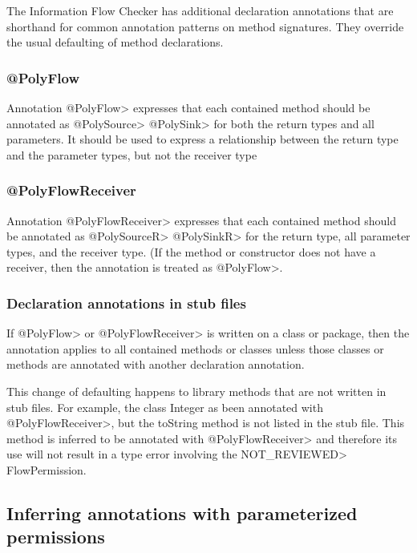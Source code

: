 The Information Flow Checker has additional declaration annotations that are shorthand for common 
annotation patterns on method signatures.   They override the usual defaulting of method declarations.

\subsubsection{@PolyFlow\label{sec:polyflow}}

Annotation \<@PolyFlow> expresses that each contained method should be annotated as \<@PolySource> 
\<@PolySink> for both the return types and all parameters. It should be used to express a relationship 
between the return type and the parameter types, but not the receiver type

\subsubsection{@PolyFlowReceiver\label{sec:polyflowreceiver}}

Annotation \<@PolyFlowReceiver> expresses that each contained method should be annotated as \<@PolySourceR> \<@PolySinkR> for the return type, all parameter types, and the receiver type.  
(If the method or constructor does not have a receiver, then the annotation is treated as \<@PolyFlow>.

\subsubsection{Declaration annotations in stub files\label{sec:declannosstubfiles}}
If \<@PolyFlow> or \<@PolyFlowReceiver> is written on a class or package, then the annotation applies
 to all contained methods or classes unless those classes or methods are annotated with another 
 declaration annotation.   

This change of defaulting happens to library methods that are not written in stub files.  For example, the class
 Integer as been annotated with  \<@PolyFlowReceiver>, but the toString method is not listed in the stub file.  
 This method is inferred to be annotated with  \<@PolyFlowReceiver> and therefore its use will not result in a 
 type error  involving the \<NOT\_REVIEWED> FlowPermission. 
 
 \subsection{Inferring annotations with parameterized permissions\label{sec:infer-param-perms}} 
 
